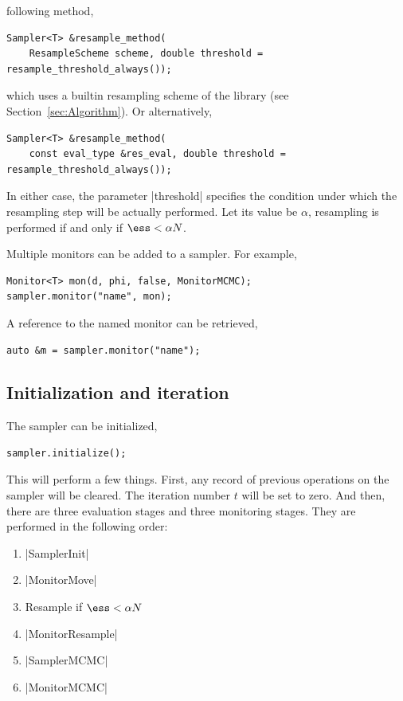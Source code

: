 following method,
\begin{Verbatim}
Sampler<T> &resample_method(
    ResampleScheme scheme, double threshold = resample_threshold_always());
\end{Verbatim}
which uses a builtin resampling scheme of the library (see
Section~\ref{sec:Algorithm}). Or alternatively,
\begin{Verbatim}
Sampler<T> &resample_method(
    const eval_type &res_eval, double threshold = resample_threshold_always());
\end{Verbatim}
In either case, the parameter |threshold| specifies the condition under which
the resampling step will be actually performed. Let its value be $\alpha$,
resampling is performed if and only if $\ess < \alpha N$.

Multiple monitors can be added to a sampler. For example,
\begin{Verbatim}
Monitor<T> mon(d, phi, false, MonitorMCMC);
sampler.monitor("name", mon);
\end{Verbatim}
A reference to the named monitor can be retrieved,
\begin{Verbatim}
auto &m = sampler.monitor("name");
\end{Verbatim}

\subsection{Initialization and iteration}
\label{sub:Initialization and iteration}

The sampler can be initialized,
\begin{Verbatim}
sampler.initialize();
\end{Verbatim}
This will perform a few things. First, any record of previous operations on the
sampler will be cleared. The iteration number $t$ will be set to zero. And
then, there are three evaluation stages and three monitoring stages. They are
performed in the following order:

\begin{enumerate}
  \item |SamplerInit|
  \item |MonitorMove|
  \item Resample if $\ess < \alpha N$
  \item |MonitorResample|
  \item |SamplerMCMC|
  \item |MonitorMCMC|
\end{enumerate}

